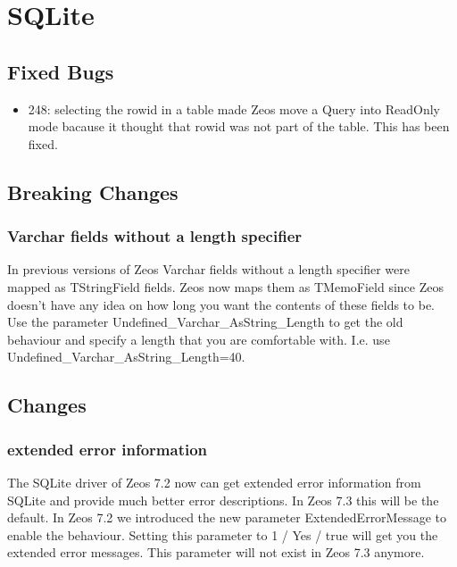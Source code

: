 \documentclass[a4paper,12pt,oneside]{book}
\begin{document}
\section{SQLite}
\label{sec:Rev6_SQLite}

\subsection{Fixed Bugs}
\label{sec:Rev6_SQLite_FixedBugs}

\begin{itemize}
\item	
  248: selecting the rowid in a table made Zeos move a Query into ReadOnly mode bacause it thought that rowid was not part of the table.
	This has been fixed.
\end{itemize}

\subsection{Breaking Changes}
\label{sec:Rev6_SQLite_BreakingChanges}

\subsubsection{Varchar fields without a length specifier}
\label{sec:Rev6_SQLite_BreakingChanges_VarcharWithoutLength}

In previous versions of Zeos Varchar fields without a length specifier were mapped as TStringField fields.
Zeos now maps them as TMemoField since Zeos doesn't have any idea on how long you want the contents of these fields to be.
Use the parameter Undefined\_Varchar\_AsString\_Length to get the old behaviour and specify a length that you are comfortable with.
I.e. use Undefined\_Varchar\_AsString\_Length=40.


\subsection{Changes}
\label{sec:Rev6_SQLite_Changes}

\subsubsection{extended error information}
\label{sec:Rev6_SQLite_Changes_ExtendedErrorInfo}
The SQLite driver of Zeos 7.2 now can get extended error information from SQLite and provide much better error descriptions.
In Zeos 7.3 this will be the default.
In Zeos 7.2 we introduced the new parameter ExtendedErrorMessage to enable the behaviour.
Setting this parameter to 1 / Yes / true will get you the extended error messages.
This parameter will not exist in Zeos 7.3 anymore.
\end{document}
